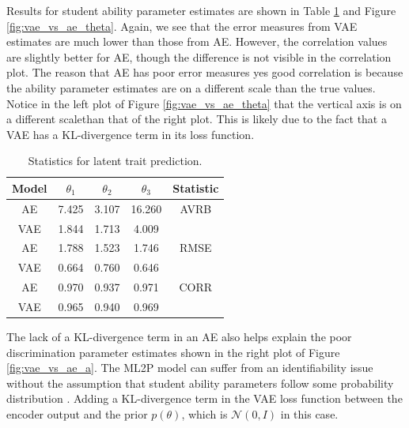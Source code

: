 Results for student ability parameter estimates are shown in Table \ref{tab:vae_vs_ae_theta} and Figure \ref{fig:vae_vs_ae_theta}. Again, we see that the error measures from VAE estimates are much lower than those from AE. However, the correlation values are slightly better for AE, though the difference is not visible in the correlation plot. The reason that AE has poor error measures yes good correlation is because the ability parameter estimates are on a different scale than the true values. Notice in the left plot of Figure \ref{fig:vae_vs_ae_theta} that the vertical axis is on a different scalethan that of the right plot. This is likely due to the fact that a VAE has a KL-divergence term in its loss function.

\begin{table}[h!]
\centering
\begin{tabular}{ccccc}
\hline
Model & $\theta_1$ & $\theta_2$ & $\theta_3$ & Statistic \\
\hline
AE &  7.425 & 3.107 & 16.260 & AVRB \\
VAE   & 1.844 & 1.713 & 4.009 &  \\
\hline
AE & 1.788 & 1.523 & 1.746 & RMSE \\
VAE   & 0.664 & 0.760 & 0.646 & \\
\hline
AE & 0.970 & 0.937 & 0.971 & CORR \\
VAE   & 0.965 & 0.940 & 0.969 & \\
\hline
\end{tabular}
\caption{Statistics for latent trait prediction.}
\label{tab:vae_vs_ae_theta}
\end{table}

The lack of a KL-divergence term in an AE also helps explain the poor discrimination parameter estimates shown in the right plot of Figure \ref{fig:vae_vs_ae_a}. The ML2P model can suffer from an identifiability issue without the assumption that student ability parameters follow some probability distribution \cite{ets2005}. Adding a KL-divergence term in the VAE loss function between the encoder output and the prior $p(\theta)$, which is $\mathcal{N}(0,I)$ in this case.

